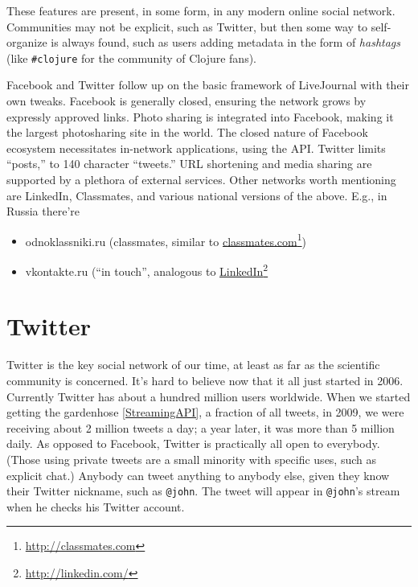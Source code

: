 \documentclass[10pt,oneside]{memoir}
\begin{document}
These features are present, in some form, in any modern online social network.  Communities may not be explicit, such as Twitter, but then some way to self-organize is always found, such as users adding metadata in the form of {\itshape hashtags} (like \texttt{\#clojure} for the community of Clojure fans).


Facebook and Twitter follow up on the basic framework of LiveJournal with their own tweaks. 
 Facebook is generally closed, ensuring the network grows by expressly approved links.  Photo sharing is integrated into Facebook, making it the largest photosharing site in the world.  The closed nature of Facebook ecosystem necessitates in-network applications, using the API.
Twitter limits ``posts,'' to 140 character ``tweets.''  URL shortening and media sharing are supported by a plethora of external services.
Other networks worth mentioning are LinkedIn, Classmates, and various national versions of the above.  E.g., in Russia there're


\begin{itemize}


\item odnoklassniki.ru (classmates, similar to \href{http://classmates.com}{classmates.com}\footnote{\href{http://classmates.com}{http://classmates.com}})

\item vkontakte.ru (``in touch'', analogous to \href{http://linkedin.com/}{LinkedIn}\footnote{\href{http://linkedin.com/}{http://linkedin.com/}}
\end{itemize}

\pagebreak \section{Twitter}
\label{twitter}

Twitter is the key social network of our time, at least as far as the scientific community is concerned.  It's hard to believe now that it all just started in 2006.  Currently Twitter has about a hundred million users worldwide.  When we started getting the gardenhose \ref{StreamingAPI}, a fraction of all tweets, in 2009, we were receiving about 2 million tweets a day; a year later, it was more than 5 million daily.  As opposed to Facebook, Twitter is practically all open to everybody.  (Those using private tweets are a small minority with specific uses, such as explicit chat.)  Anybody can tweet anything to anybody else, given they know their Twitter nickname, such as \texttt{@john}.  The tweet will appear in \texttt{@john}'s stream when he checks his Twitter account.  
\end{document}
